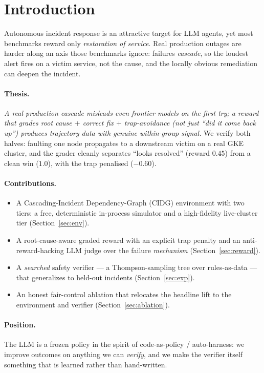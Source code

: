 \section{Introduction}
\label{sec:intro}

Autonomous incident response is an attractive target for LLM agents, yet most benchmarks
reward only \emph{restoration of service}. Real production outages are harder along an axis
those benchmarks ignore: failures \emph{cascade}, so the loudest alert fires on a victim
service, not the cause, and the locally obvious remediation can deepen the incident.

\paragraph{Thesis.}
\emph{A real production cascade misleads even frontier models on the first try; a reward that
grades root cause \(+\) correct fix \(+\) trap-avoidance (not just ``did it come back up'')
produces trajectory data with genuine within-group signal.} We verify both halves: faulting
one node propagates to a downstream victim on a real GKE cluster, and the grader cleanly
separates ``looks resolved'' (reward \(0.45\)) from a clean win (\(1.0\)), with the trap
penalised (\(-0.60\)).

\paragraph{Contributions.}
\begin{itemize}
  \item A Cascading-Incident Dependency-Graph (CIDG) environment with two tiers: a free,
        deterministic in-process simulator and a high-fidelity live-cluster tier
        (Section~\ref{sec:env}).
  \item A root-cause-aware graded reward with an explicit trap penalty and an
        anti-reward-hacking LLM judge over the failure \emph{mechanism}
        (Section~\ref{sec:reward}).
  \item A \emph{searched} safety verifier --- a Thompson-sampling tree over rules-as-data ---
        that generalizes to held-out incidents (Section~\ref{sec:exp}).
  \item An honest fair-control ablation that relocates the headline lift to the environment
        and verifier (Section~\ref{sec:ablation}).
\end{itemize}

\paragraph{Position.}
The LLM is a frozen policy in the spirit of code-as-policy / auto-harness: we improve outcomes
on anything we can \emph{verify}, and we make the verifier itself something that is learned
rather than hand-written.
